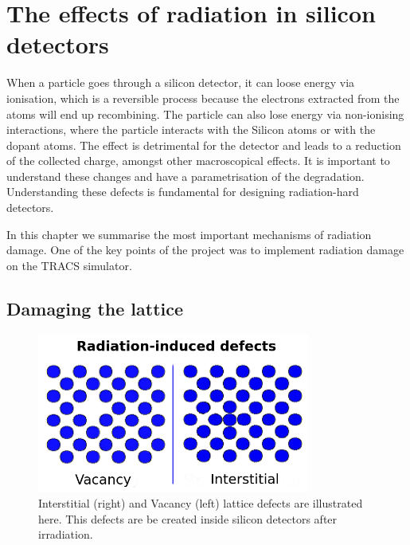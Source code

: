 \clearpage
{}  %
\chapter{The effects of radiation in silicon detectors}%
\label{chap:rad}

When a particle goes through a silicon detector, it can loose energy via ionisation, which is a reversible process because the electrons extracted from the atoms will end up recombining. The particle can also lose energy via non-ionising interactions, where the particle interacts with the Silicon atoms or with the dopant atoms. The effect is detrimental for the detector and leads to a reduction of the collected charge, amongst other macroscopical effects. It is important to understand these changes and have a parametrisation of the degradation. Understanding these defects is fundamental for designing radiation-hard detectors.

In this chapter we summarise the most important mechanisms of radiation damage. One of the key points of the project was to implement radiation damage on the TRACS simulator.


\section{Damaging the lattice}%

\begin{figure}[H]
	\centering
	\includegraphics[width=0.8\textwidth]{chap3_defects.png}
	\caption{Interstitial (right) and Vacancy (left) lattice defects are illustrated here. This defects are be created inside silicon detectors after irradiation.}
	\label{fig:IV}
\end{figure}

